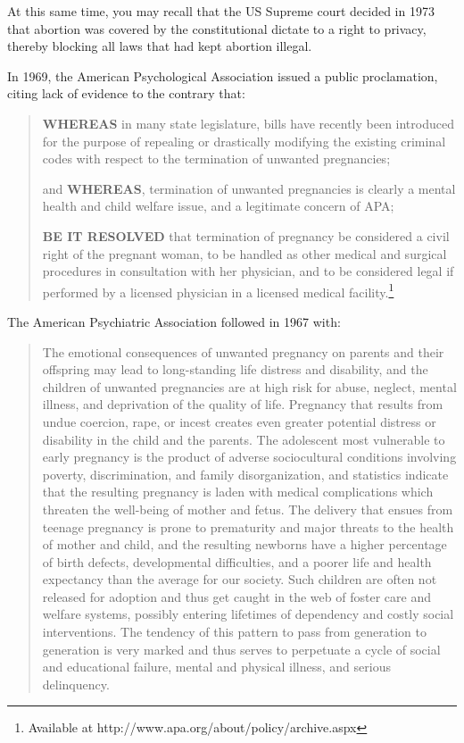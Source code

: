 \begin{refsection}
At this same time, you may recall that the US Supreme court decided in 1973 that abortion was covered by the constitutional dictate to a right to privacy, thereby blocking all laws that had kept abortion illegal.

In 1969, the American Psychological Association issued a public proclamation, citing lack of evidence to the contrary that:

\begin{quote}

\textbf{WHEREAS} in many state legislature, bills have recently been introduced for the purpose of repealing or drastically modifying the existing criminal codes with respect to the termination of unwanted pregnancies;

and \textbf{WHEREAS}, termination of unwanted pregnancies is clearly a mental health and child welfare issue, and a legitimate concern of APA;

\textbf{BE IT RESOLVED} that termination of pregnancy be considered a civil right of the pregnant woman, to be handled as other medical and surgical procedures in consultation with her physician, and to be considered legal if performed by a licensed physician in a licensed medical facility.\footnote{Available at http:\slash \slash www.apa.org\slash about\slash policy\slash archive.aspx}
\end{quote}

The American Psychiatric Association followed in 1967 with:

\begin{quote}

The emotional consequences of unwanted pregnancy on parents and their offspring may lead to long-standing life distress and disability, and the children of unwanted pregnancies are at high risk for abuse, neglect, mental illness, and deprivation of the quality of life. Pregnancy that results from undue coercion, rape, or incest creates even greater potential distress or disability in the child and the parents. The adolescent most vulnerable to early pregnancy is the product of adverse sociocultural conditions involving poverty, discrimination, and family disorganization, and statistics indicate that the resulting pregnancy is laden with medical complications which threaten the well-being of mother and fetus. The delivery that ensues from teenage pregnancy is prone to prematurity and major threats to the health of mother and child, and the resulting newborns have a higher percentage of birth defects, developmental difficulties, and a poorer life and health expectancy than the average for our society. Such children are often not released for adoption and thus get caught in the web of foster care and welfare systems, possibly entering lifetimes of dependency and costly social interventions. The tendency of this pattern to pass from generation to generation is very marked and thus serves to perpetuate a cycle of social and educational failure, mental and physical illness, and serious delinquency.


\end{quote}
\end{refsection}
